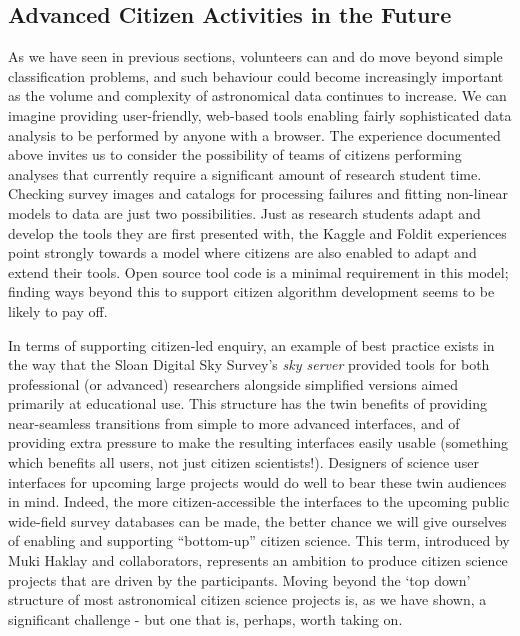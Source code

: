 \documentclass{ar2e}
\begin{document}
\subsection{Advanced Citizen Activities in the Future}

As we have seen in previous sections, volunteers can and do move beyond simple
classification problems, and such behaviour could become increasingly important
as the volume and complexity of astronomical data continues to increase.  We can
imagine providing user-friendly, web-based tools enabling  fairly sophisticated
data analysis to be performed by anyone with a browser. The experience
documented above invites us to consider the possibility of teams of citizens 
performing analyses that currently require a significant amount of research
student time.  Checking survey images and catalogs  for processing failures and
fitting non-linear models to data are just two possibilities. Just as research
students adapt and develop the tools they are first presented with, the Kaggle
and Foldit experiences point strongly towards a model where citizens are also
enabled to adapt and extend their tools. Open source tool code is a minimal requirement in
this model; finding ways beyond this to support citizen algorithm development
seems to be likely to pay off.

In terms of supporting citizen-led enquiry, an example of best practice exists
in the way that the Sloan Digital Sky Survey's \textit{sky server} provided
tools for both professional (or advanced) researchers alongside simplified
versions aimed primarily at educational use. This structure has the twin
benefits of providing near-seamless transitions from simple to more advanced
interfaces, and of providing extra pressure to make the resulting interfaces
easily usable  (something which benefits all users, not just citizen
scientists!). Designers of science user interfaces for upcoming large projects
would do well to bear these twin audiences in mind. Indeed, the more
citizen-accessible the interfaces to the upcoming public wide-field survey
databases can be made, the better chance we will give ourselves of enabling and
supporting ``bottom-up'' citizen science.   This term, introduced by Muki Haklay
and collaborators, represents an ambition to produce citizen science projects
that are driven by the participants. Moving beyond the `top down' structure of
most astronomical citizen science projects is, as we have shown, a significant
challenge - but one that is, perhaps, worth taking on. 
\end{document}
